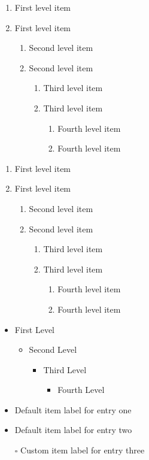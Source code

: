 \documentclass{article}
\begin{document}
\renewcommand{\labelenumii}{\Roman{enumii}}
\begin{enumerate}
  \item First level item
  \item First level item
  \begin{enumerate}
    \item Second level item
    \item Second level item
    \begin{enumerate}
      \item Third level item
      \item Third level item
      \begin{enumerate}
        \item Fourth level item
        \item Fourth level item
      \end{enumerate}
    \end{enumerate}
\end{enumerate}
\end{enumerate}


\renewcommand{\theenumi}{\Alph{enumi}}
\renewcommand{\theenumii}{\Roman{enumii}}
\renewcommand{\theenumiii}{\roman{enumiii}}
\renewcommand{\theenumiv}{\alph{enumiv}}
\begin{enumerate}
  \item First level item
  \item First level item
  \begin{enumerate}
    \item Second level item
    \item Second level item
    \begin{enumerate}
      \item Third level item
      \item Third level item
      \begin{enumerate}
        \item Fourth level item
        \item Fourth level item
      \end{enumerate}
    \end{enumerate}
\end{enumerate}
\end{enumerate}

\renewcommand{\labelitemi}{$\blacksquare$}
\renewcommand\labelitemii{$\square$}
\begin{itemize}
  \item First Level
  \begin{itemize}
    \item Second Level
    \begin{itemize}
      \item Third Level
      \begin{itemize}
        \item Fourth Level
      \end{itemize}
    \end{itemize}
  \end{itemize}
\end{itemize}

\begin{itemize}
 \item  Default item label for entry one
 \item  Default item label for entry two
 \item[$\square$]  Custom item label for entry three
\end{itemize}
\end{document}
